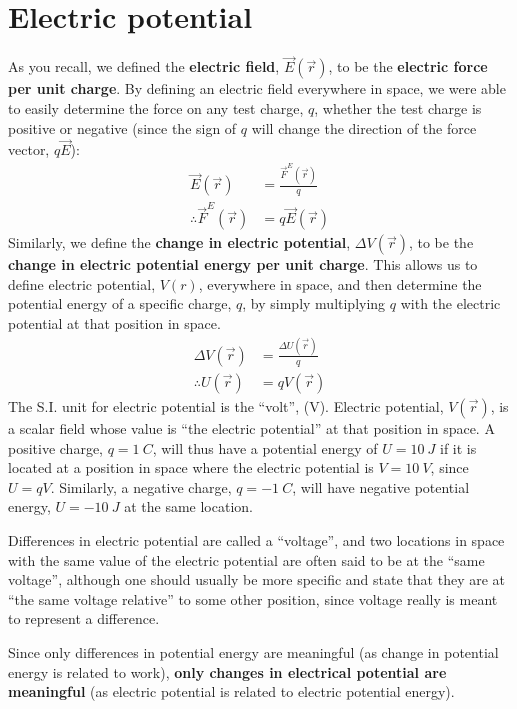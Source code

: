 \section{Electric potential}
As you recall, we defined the \textbf{electric field}, $\vec E(\vec r)$, to be the \textbf{electric force per unit charge}. By defining an electric field everywhere in space, we were able to easily determine the force on any test charge, $q$, whether the test charge is positive or negative (since the sign of $q$ will change the direction of the force vector, $q\vec E$):
\begin{align*}
\vec E(\vec r) &= \frac{\vec F^E(\vec r)}{q}\\
\therefore \vec F^E(\vec r)&=q\vec E(\vec r)
\end{align*}
Similarly, we define the \textbf{change in electric potential}, $\Delta V(\vec r)$, to be the \textbf{change in electric potential energy per unit charge}. This allows us to define electric potential, $V(r)$, everywhere in space, and then determine the potential energy of a specific charge, $q$, by simply multiplying $q$ with the electric potential at that position in space.
\begin{align*}
\Delta V(\vec r) &= \frac{\Delta U(\vec r)}{q}\\
\therefore U(\vec r)&= q V(\vec r)
\end{align*}
The S.I. unit for electric potential is the ``volt'', (V). Electric potential, $V(\vec r)$, is a scalar field whose value is ``the electric potential'' at that position in space. A positive charge, $q=\SI{1}{C}$, will thus have a potential energy of $U=\SI{10}{J}$ if it is located at a position in space where the electric potential is $V=\SI{10}{V}$, since $U=qV$. Similarly, a negative charge, $q=\SI{-1}{C}$, will have negative potential energy, $U=\SI{-10}{J}$ at the same location.

Differences in electric potential are called a ``voltage'', and two locations in space with the same value of the electric potential are often said to be at the ``same voltage'', although one should usually be more specific and state that they are at ``the same voltage relative'' to some other position, since voltage really is meant to represent a difference.

Since only differences in potential energy are meaningful (as change in potential energy is related to work), \textbf{only changes in electrical potential are meaningful} (as electric potential is related to electric potential energy). 

